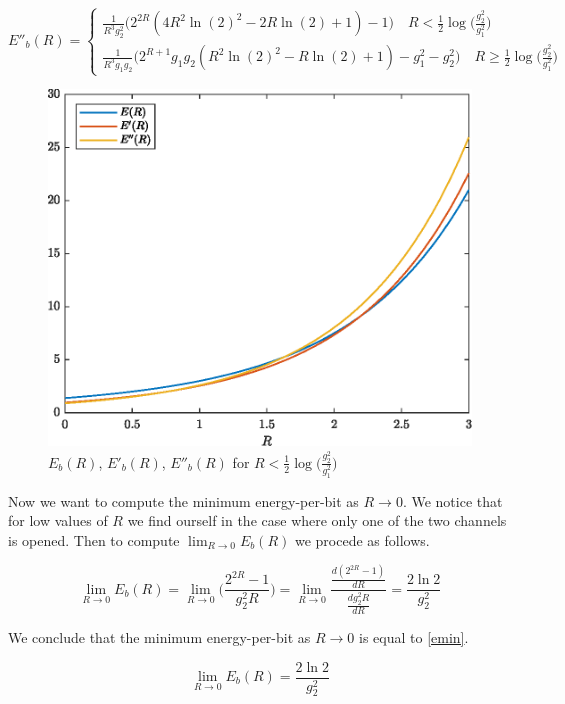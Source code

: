 \begin{equation}
	E''_b(R)= \begin{cases}
		\frac{1}{R^3g_2^2} \Big(2^{2R}(4R^2\ln(2)^2 -2R \ln(2)+1)-1\Big)  \quad R < \frac{1}{2} \log\Big(\frac{g_2^2}{g_1^2}\Big) \\
		\frac{1}{R^3 g_1 g_2} \Big( 2^{R+1} g_1 g_2 ( R^2 \ln(2)^2 - R \ln(2) +1 ) -g_1^2 -g_2^2 \Big) \quad R \geq \frac{1}{2} \log\Big(\frac{g_2^2}{g_1^2}\Big)

\end{cases}
\end{equation}

\begin{figure}[h!]
	\centering
	\includegraphics[width=0.7\linewidth]{img/energy_per_bit_1.eps}
	\caption{$E_b(R)$, $E'_b(R)$, $E''_b(R)$ for $R < \frac{1}{2} \log\Big(\frac{g_2^2}{g_1^2}\Big)$ }
	\label{fig:funcex2}
\end{figure}


Now we want to compute the minimum energy-per-bit as $R \rightarrow 0$. We notice that for low values of $R$ we find ourself in the case where only one of the two channels is opened. Then to compute $\lim_{R \rightarrow 0} E_b(R)$ we procede as follows.

\begin{equation}
	\lim_{R \rightarrow 0} E_b(R) =
		\lim_{R \rightarrow 0} \Big(\frac{2^{2R}-1}{g_2^2 R}\Big) = \lim_{R \rightarrow 0} \frac{ \frac{d(2^{2R}-1)}{dR}} {\frac{dg_2^2 R}{dR}}=\frac{2\ln{2}}{g_2^2}
\end{equation}

We conclude that the minimum energy-per-bit as $R \rightarrow 0$ is equal to \eqref{emin}.

\begin{equation}
	\lim_{R \rightarrow 0} E_b(R) =
		\frac{2\ln{2}}{g_2^2}
\label{emin}
\end{equation}

